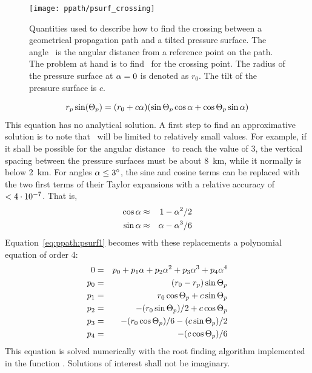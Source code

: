 \begin{figure}
 \begin{minipage}[c]{0.45\textwidth}
 \texttt{[image: ppath/psurf\_crossing]}
 \end{minipage}%
 \begin{minipage}[c]{0.55\textwidth}
  \caption{Quantities used to describe how to find the crossing between a 
    geometrical propagation path and a tilted pressure surface. The
    angle \Lat\ is the angular distance from a reference point on the
    path. The problem at hand is to find \Lat\ for the crossing
    point. The radius of the pressure surface at $\alpha = 0$ is
    denoted as $r_0$. The tilt of the pressure surface is $c$.}
  \label{fig:ppath:psurf_crossing}
 \end{minipage}%
\end{figure}   

\begin{equation}
   r_{p} \sin(\Theta_p) = (r_{0}+c\alpha) 
           (\sin\Theta_p \cos\alpha + \cos\Theta_p \sin\alpha)
 \label{eq:ppath:psurf1}
\end{equation}
This equation has no analytical solution. A first step to find an
approximative solution is to note that \Lat\ will be limited to
relatively small values. For example, if it shall be possible for the
angular distance \Lat\ to reach the value of 3\degree, the vertical
spacing between the pressure surfaces must be about 8~km, while it
normally is below 2~km. For angles $\alpha \leq 3^\circ$, the sine and
cosine terms can be replaced with the two first terms of their Taylor
expansions with a relative accuracy of $< 4\cdot10^{-7}$. That is,
\begin{eqnarray}
  \cos \alpha & \approx & 1 - \alpha^2 / 2    \nonumber \\
  \sin \alpha & \approx & \alpha - \alpha^3 / 6 \nonumber
\end{eqnarray}
Equation~\ref{eq:ppath:psurf1} becomes with these replacements a
polynomial equation of order 4:
\begin{eqnarray}
  0 & = & p_0 + p_1 \alpha + p_2 \alpha^2 + p_3 \alpha^3 + p_4 \alpha^4 \\
  p_0 & = & (r_{0}-r_{p}) \sin\Theta_p \nonumber \\ 
  p_1 & = & r_{0}\cos\Theta_p + c \sin\Theta_p \nonumber \\ 
  p_2 & = & -(r_{0}\sin\Theta_p)/2 + c\cos\Theta_p  \nonumber \\ 
  p_3 & = & -(r_{0}\cos\Theta_p)/6 - (c\sin\Theta_p)/2 \nonumber \\ 
  p_4 & = & -(c \cos\Theta_p)/6  \nonumber 
  \label{eq:ppath:psurf2}
\end{eqnarray}
This equation is solved numerically with the root finding algorithm
implemented in the function . Solutions of
interest shall not be imaginary.


